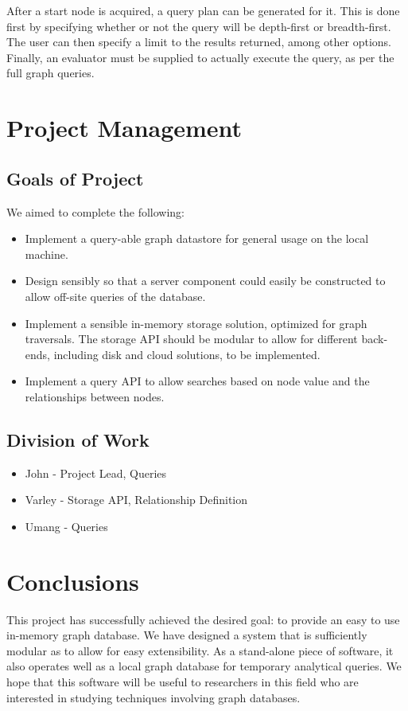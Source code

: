 \documentclass[11pt]{article}
\begin{document}
After a start node is acquired, a query plan can be generated for it. This is done first by specifying whether or not the query will be depth-first or breadth-first. The user can then specify a limit to the results returned, among other options. Finally, an evaluator must be supplied to actually execute the query, as per the full graph queries.

\section{Project Management}

\subsection{Goals of Project}
We aimed to complete the following:

\begin{itemize}
\item Implement a query-able graph datastore for general usage on the local machine.
\item Design sensibly so that a server component could easily be constructed to allow off-site queries of the database.
\item Implement a sensible in-memory storage solution, optimized for graph traversals. The storage API should be modular to allow for different back-ends, including disk and cloud solutions, to be implemented.
\item Implement a query API to allow searches based on node value and the relationships between nodes.
\end{itemize}

\subsection{Division of Work}

\begin{itemize}
\item John - Project Lead, Queries
\item Varley - Storage API, Relationship Definition
\item Umang -  Queries
\end{itemize}

\section{Conclusions}

This project has successfully achieved the desired goal: to provide an easy to use in-memory graph database. We have designed a system that is sufficiently modular as to allow for easy extensibility. As a stand-alone piece of software, it also operates well as a local graph database for temporary analytical queries.  We hope that this software will be useful to researchers in this field who are interested in studying techniques involving graph databases.



\end{document}

